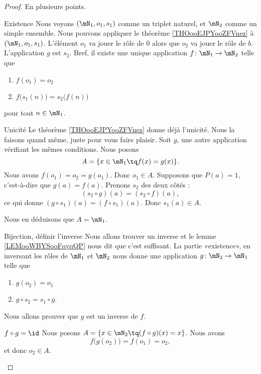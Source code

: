 \begin{proof}
    En plusieurs points.
    \begin{subproof}
    \item[Existence]
        Nous voyons \( (\mN_1, o_1, s_1)\) comme un triplet naturel, et \( \mN_2\) comme un simple ensemble. Nous pouvons appliquer le théorème \ref{THOooEJPYooZFVnez} à \( (\mN_1, o_1, s_1)\). L'élément \( o_1\) va jouer le rôle de \( 0\) alors que \( o_2\) va jouer le rôle de \( b\). L'application \( g\) est \( s_2\). Bref, il existe une unique application \( f\colon \mN_1\to \mN_2\) telle que
        \begin{enumerate}
            \item
                $f(o_1)=o_2$ 
            \item
                \( f\big( s_1(n) \big)=s_2\big( f(n) \big)\)
        \end{enumerate}
        pour tout \( n\in \mN_1\).
    \item[Unicité]
        Le théorème \ref{THOooEJPYooZFVnez} donne déjà l'unicité. Nous la faisons quand même, juste pour vous faire plaisir. Soit \( g\), une autre application vérifiant les mêmes conditions. Nous posons
        \begin{equation}
            A=\{ x\in \mN_1\tq f(x)=g(x) \}.
        \end{equation}
        Nous avons \( f(o_1)=o_2=g(o_1)\). Donc \( o_1\in A\). Supposons que \( P(a)=1\), c'est-à-dire que \( g(a)=f(a)\). Prenons \( s_2\) des deux côtés :
        \begin{equation}
            (s_2\circ g)(a)=(s_2\circ f)(a),
        \end{equation}
        ce qui donne \( (g\circ s_1)(a)=(f\circ s_1)(a)\). Donc \( s_1(a)\in A\).

        Nous en déduisons que \( A=\mN_1\).
    \item[Bijection, définir l'inverse]
        Nous allons trouver un inverse et le lemme \ref{LEMooWBYSooFqyqQP} nous dit que c'est suffisant. La partie «existence», en inversant les rôles de \( \mN_1\) et \( \mN_2\) nous donne une application \( g\colon \mN_2\to \mN_1\) telle que
        \begin{enumerate}
            \item
                \( g(o_2)=o_1\)
            \item
                \( g\circ s_2=s_1\circ g\).
        \end{enumerate}
        Nous allons prouver que \( g\) est un inverse de \( f\).
    \item[\( f\circ g=\id\)]
        Nous posons \( A=\{ x\in \mN_2\tq (f\circ g)(x)=x \}\). Nous avons
        \begin{equation}
            f\big( g(o_2) \big)=f(o_1)=o_2,
        \end{equation}
        et donc \( o_2\in A\).


\end{subproof}
\end{proof}
